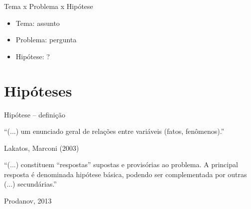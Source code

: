 \documentclass{beamer}
\begin{document}
\begin{frame}{Tema x Problema x Hipótese}
  \begin{itemize}
    \footnotesize
  \item Tema: assunto
    \bigskip
  \item Problema: pergunta
    \bigskip
  \item Hipótese: ?
  \end{itemize}
\end{frame}

\section{Hipóteses}


\begin{frame}{Hipótese -- definição}
  \begin{block}{}
    \footnotesize
    ``(...) um enunciado geral de \alert{relações entre variáveis}
    (fatos, fenômenos).''

    \vfill
    \scriptsize
    \hfill Lakatos, Marconi (2003)
  \end{block}
  \bigskip
  \begin{block}{}
    \footnotesize
    ``(...) constituem ``respostas'' supostas e provisórias ao
    problema. A principal resposta é denominada hipótese básica,
    podendo ser complementada por outras (...) secundárias.''

    \vfill
    \scriptsize
    \hfill Prodanov, 2013
  \end{block}
\end{frame}
\end{document}
